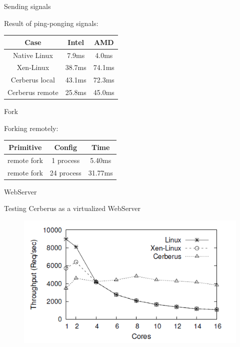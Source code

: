 \documentclass{beamer}
\begin{document}
	\begin{frame}{Sending signals}

		Result of ping-ponging signals:
		
		\begin{tabular}{|c|c|c|}
		\hline Case & Intel & AMD \\ 
		\hline Native Linux & 7.9ms & 4.0ms \\ 
		\hline Xen-Linux & 38.7ms & 74.1ms \\ 
		\hline Cerberus local & 43.1ms & 72.3ms \\ 
		\hline Cerberus remote & 25.8ms & 45.0ms \\ 
		\hline 
		\end{tabular} 
	
	\end{frame}
	
	\begin{frame}{Fork}

		Forking remotely:		
		
		\begin{tabular}{|c|c|c|}
		\hline Primitive & Config & Time \\ 
		\hline remote fork & 1 process & 5.40ms \\ 
		\hline remote fork & 24 process & 31.77ms \\ 		
		\hline 
		\end{tabular} 

	\end{frame}
	
	\begin{frame}{WebServer}
	
		Testing Cerberus as a virtualized WebServer
	
		\begin{figure} [H]
			\centering
			\includegraphics[scale=0.60]{img/cerberus-webserver}
		\end{figure}		
	
	\end{frame}	
	
\end{document}
